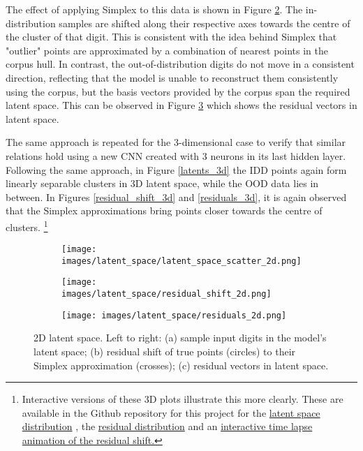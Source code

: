 \documentclass{article}
\begin{document}
The effect of applying Simplex to this data is shown in Figure \ref{residual_shift_2d}. The in-distribution samples are shifted along their respective axes towards the centre of the cluster of that digit. This is consistent with the idea behind Simplex that "outlier" points are approximated by a combination of nearest points in the corpus hull. In contrast, the out-of-distribution digits do not move in a consistent direction, reflecting that the model is unable to reconstruct them consistently using the corpus, but the basis vectors provided by the corpus span the required latent space. This can be observed in Figure \ref{residuals_2d} which shows the residual vectors in latent space.

The same approach is repeated for the 3-dimensional case to verify that similar relations hold using a new CNN created with 3 neurons in its last hidden layer. Following the same approach, in Figure \ref{latents_3d} the IDD points again form linearly separable clusters in 3D latent space, while the OOD data lies in between. In Figures \ref{residual_shift_3d} and \ref{residuals_3d}, it is again observed that the Simplex approximations bring points closer towards the centre of clusters.
\footnote{Interactive versions of these 3D plots illustrate this more clearly. These are available in the Github repository for this project for the
\href{https://htmlpreview.github.io/?https://github.com/gjohl/xai/blob/master/xai/experiments/report_figures/latent_space/interactive_latent_space_scatter_3d.html}{latent space distribution}
, the
\href{https://htmlpreview.github.io/?https://github.com/gjohl/xai/blob/master/xai/experiments/report_figures/latent_space/interactive_residuals_3d.html}{residual distribution}
and an
\href{https://htmlpreview.github.io/?https://github.com/gjohl/xai/blob/master/xai/experiments/report_figures/latent_space/interactive_residual_shift_3d.html}{interactive time lapse animation of the residual shift.}
}


\begin{figure}[t]

\begin{subfigure}{.33\linewidth}
  \texttt{[image: images/latent\_space/latent\_space\_scatter\_2d.png]}
  \caption{}
  \label{latents_2d}
\end{subfigure}\hfill %
\begin{subfigure}{.33\linewidth}
  \texttt{[image: images/latent\_space/residual\_shift\_2d.png]}
  \caption{}
  \label{residual_shift_2d}
\end{subfigure}\hfill %
\begin{subfigure}{.33\linewidth}
  \texttt{[image: images/latent\_space/residuals\_2d.png]}
  \caption{}
  \label{residuals_2d}
\end{subfigure}

\caption{2D latent space. Left to right: (a) sample input digits in the model's latent space; (b) residual shift of true points (circles) to their Simplex approximation (crosses); (c) residual vectors in latent space.}
\label{fig:latent_plots_2d}
\end{figure}
\end{document}
